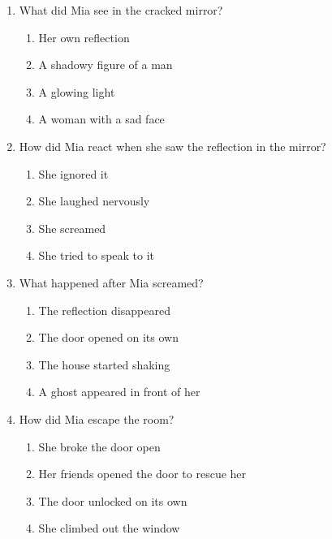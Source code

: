 \documentclass[12pt]{article}
\begin{document}
\begin{enumerate}
    \vspace{0.5cm}

    \item What did Mia see in the cracked mirror?

    \begin{enumerate}[label=\Alph*.]
        \item Her own reflection
        \item A shadowy figure of a man
        \item A glowing light
        \item A woman with a sad face
    \end{enumerate}
    
    \vspace{0.5cm}

    \item How did Mia react when she saw the reflection in the mirror?

    \begin{enumerate}[label=\Alph*.]
        \item She ignored it
        \item She laughed nervously
        \item She screamed
        \item She tried to speak to it
    \end{enumerate}
    
    \vspace{0.5cm}

    \item What happened after Mia screamed?

    \begin{enumerate}[label=\Alph*.]
        \item The reflection disappeared
        \item The door opened on its own
        \item The house started shaking
        \item A ghost appeared in front of her
    \end{enumerate}
    
    \vspace{0.5cm}

    \item How did Mia escape the room?

    \begin{enumerate}[label=\Alph*.]
        \item She broke the door open
        \item Her friends opened the door to rescue her
        \item The door unlocked on its own
        \item She climbed out the window
    \end{enumerate}
    

\end{enumerate}
\end{document}
